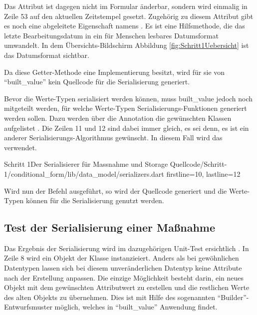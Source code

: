 Das Attribut  ist dagegen nicht im Formular änderbar, sondern wird einmalig in Zeile 53 auf den aktuellen Zeitstempel gesetzt.
Zugehörig zu diesem Attribut gibt es noch eine abgeleitete Eigenschaft namens  .  Es ist eine Hilfsmethode, die das letzte Bearbeitungsdatum in ein für Menschen lesbares Datumsformat umwandelt. In dem Übersichts-Bildschirm Abbildung \ref{fig:Schritt1Uebersicht} ist das Datumsformat sichtbar.

Da diese Getter-Methode eine Implementierung besitzt, wird für sie von \enquote{built_value} kein Quellcode für die Serialisierung generiert.

Bevor die Werte-Typen serialisiert werden können, muss built_value jedoch noch mitgeteilt werden, für welche Werte-Typen Serialisierungs-Funktionen generiert werden sollen.
Dazu werden über die Annotation  die gewünschten Klassen aufgelistet .
Die Zeilen 11 und 12 sind dabei immer gleich, es sei denn, es ist ein anderer Serialisierungs-Algorithmus gewünscht.
In diesem Fall wird das verwendet.

\begin{alexlisting}{Schritt 1}{Der Serialisierer für Massnahme und Storage}
  {Quellcode/Schritt-1/conditional_form/lib/data_model/serializers.dart}
  {firstline=10, lastline=12}
  \label{lst:Schritt1Serialisierer}
\end{alexlisting}


Wird nun der Befehl   ausgeführt, so wird der Quellcode generiert und die Werte-Typen können für die Serialisierung genutzt werden.

\subsection{Test der Serialisierung einer Maßnahme}

Das Ergebnis der Serialisierung wird im dazugehörigen Unit-Test ersichtlich \Lst{\ref{lst:SerialisierungEinerMassnahmeUnittest}}.
In Zeile 8 wird ein Objekt der Klasse  instanzieiert.
Anders als bei gewöhnlichen Datentypen lassen sich bei diesem unveränderlichen Datentyp keine Attribute nach der Erstellung anpassen.
Die einzige Möglichkeit besteht darin, ein neues Objekt  mit dem gewünschten Attributwert zu erstellen und die restlichen Werte des alten Objekts zu übernehmen.
Dies ist mit Hilfe des sogenannten \enquote{Builder}-Entwurfsmuster möglich, welches in \enquote{built_value} Anwendung findet.

